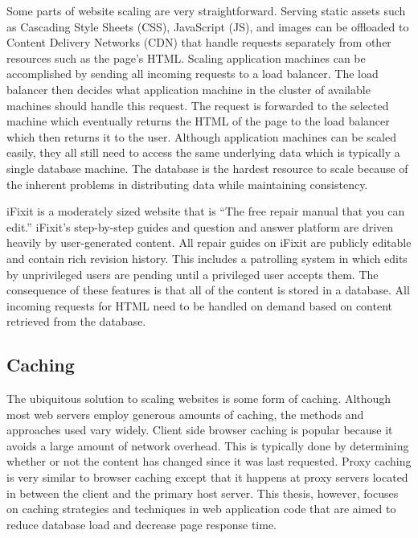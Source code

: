 \documentclass[12pt]{ucthesis}
\begin{document}
Some parts of website scaling are very straightforward.
Serving static assets such as Cascading Style Sheets (CSS), JavaScript (JS), and images can be offloaded to Content Delivery Networks (CDN) that handle requests separately from other resources such as the page's HTML.
Scaling application machines can be accomplished by sending all incoming requests to a load balancer.
The load balancer then decides what application machine in the cluster of available machines should handle this request.
The request is forwarded to the selected machine which eventually returns the HTML of the page to the load balancer which then returns it to the user.
Although application machines can be scaled easily, they all still need to access the same underlying data which is typically a single database machine.
The database is the hardest resource to scale because of the inherent problems in distributing data while maintaining consistency.

iFixit is a moderately sized website that is ``The free repair manual that you can edit.''
iFixit's step-by-step guides and question and answer platform are driven heavily by user-generated content.
All repair guides on iFixit are publicly editable and contain rich revision history.
This includes a patrolling system in which edits by unprivileged users are pending until a privileged user accepts them.
The consequence of these features is that all of the content is stored in a database.
All incoming requests for HTML need to be handled on demand based on content retrieved from the database.

\subsection{Caching}
The ubiquitous solution to scaling websites is some form of caching.
Although most web servers employ generous amounts of caching, the methods and approaches used vary widely.
Client side browser caching is popular because it avoids a large amount of network overhead.
This is typically done by determining whether or not the content has changed since it was last requested.
Proxy caching is very similar to browser caching except that it happens at proxy servers located in between the client and the primary host server.
This thesis, however, focuses on caching strategies and techniques in web application code that are aimed to reduce database load and decrease page response time.
\end{document}

